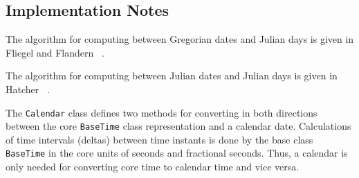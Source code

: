 
\subsection{Implementation Notes}

The algorithm for computing between Gregorian dates and Julian days is given 
in Fliegel and Flandern ~\cite{Fli68}.

The algorithm for computing between Julian dates and Julian days is given 
in Hatcher ~\cite{Hat84}.

The {\tt Calendar} class defines two methods for converting in both
directions between the core {\tt BaseTime} class representation and a
calendar date.  Calculations of time intervals (deltas) between
time instants is done by the base class {\tt BaseTime} in the core units
of seconds and fractional seconds.  Thus,  a calendar is only needed for
converting core time to calendar time and vice versa.

